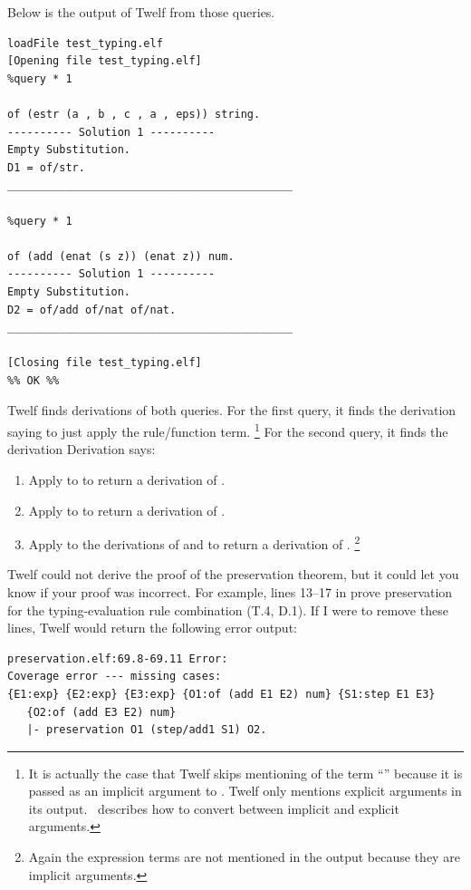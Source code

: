 Below is the output of Twelf from those queries.

\begin{verbatim}
loadFile test_typing.elf
[Opening file test_typing.elf]
%query * 1

of (estr (a , b , c , a , eps)) string.
---------- Solution 1 ----------
Empty Substitution.
D1 = of/str.
____________________________________________

%query * 1

of (add (enat (s z)) (enat z)) num.
---------- Solution 1 ----------
Empty Substitution.
D2 = of/add of/nat of/nat.
____________________________________________

[Closing file test_typing.elf]
%% OK %%
\end{verbatim}

Twelf finds derivations of both queries.
For the first query, it finds the derivation
 saying to just apply
the  rule/function term.
\footnote{It is actually the case that
Twelf skips mentioning of the term
``'' because
it is passed as an implicit argument to
.
Twelf only mentions explicit arguments in
its output.~\cite{Twelf-ConvertImplicit}
describes how to convert between implicit
and explicit arguments.}
For the second query,
it finds the derivation
Derivation  says:
\begin{enumerate}
\item Apply  to 
to return a derivation of .
\item Apply  to 
to return a derivation of .
\item Apply  to the derivations
of  and 
to return a derivation of
.
\footnote{Again the expression terms are not
mentioned in the output because they are implicit
arguments.}
\end{enumerate}

Twelf could not derive the proof of the preservation theorem,
but it could let you know if your proof was incorrect.
For example, lines 13--17 in 
prove preservation for the typing-evaluation rule combination
(T.4, D.1).
If I were to remove these lines, Twelf would return the following
error output:

\begin{verbatim}
preservation.elf:69.8-69.11 Error: 
Coverage error --- missing cases:
{E1:exp} {E2:exp} {E3:exp} {O1:of (add E1 E2) num} {S1:step E1 E3}
   {O2:of (add E3 E2) num}
   |- preservation O1 (step/add1 S1) O2.
\end{verbatim}

